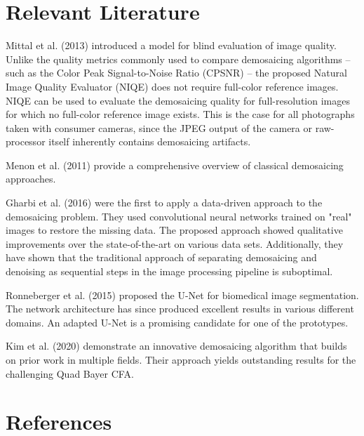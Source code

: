 \documentclass[english,notitlepage,smartquotes]{hgbreport}
\begin{document}
\section{Relevant Literature}

Mittal et al. (2013) \cite{Mittal2013} introduced a model for blind evaluation of image quality. 
Unlike the quality metrics commonly used to compare demosaicing algorithms -- such as the Color Peak Signal-to-Noise Ratio (CPSNR) \cite{Menon2011} -- the proposed Natural Image Quality Evaluator (NIQE) does not require full-color reference images. 
NIQE can be used to evaluate the demosaicing quality for full-resolution images for which no full-color reference image exists. 
This is the case for all photographs taken with consumer cameras, since the JPEG output of the camera or raw-processor itself inherently contains demosaicing artifacts.

Menon et al. (2011) \cite{Menon2011} provide a comprehensive overview of classical demosaicing approaches.

Gharbi et al. (2016) \cite{Gharbi2016} were the first to apply a data-driven approach to the demosaicing problem. 
They used convolutional neural networks trained on "real" images to restore the missing data. 
The proposed approach showed qualitative improvements over the state-of-the-art on various data sets. 
Additionally, they have shown that the traditional approach of separating demosaicing and denoising as sequential steps in the image processing pipeline is suboptimal.

Ronneberger et al. (2015) \cite{Ronneberger2015} proposed the U-Net for biomedical image segmentation. 
The network architecture has since produced excellent results in various different domains. 
An adapted U-Net is a promising candidate for one of the prototypes.

Kim et al. (2020) \cite{Kim2020} demonstrate an innovative demosaicing algorithm that builds on prior work in multiple fields. 
Their approach yields outstanding results for the challenging Quad Bayer CFA.

  
\section*{References}

\printbibliography[heading=noheader]

\end{document}
